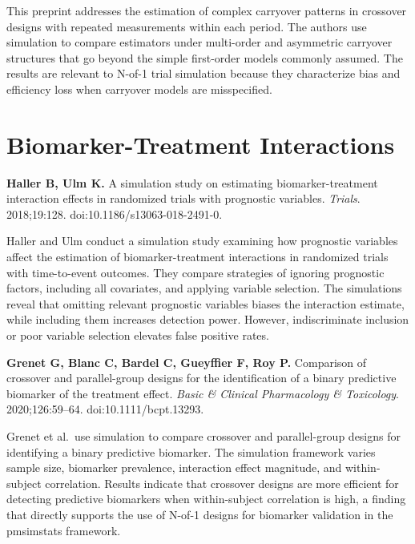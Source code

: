 \documentclass[11pt]{article}
\begin{document}
\smallskip\noindent
This preprint addresses the estimation of complex carryover
patterns in crossover designs with repeated measurements
within each period. The authors use simulation to compare
estimators under multi-order and asymmetric carryover
structures that go beyond the simple first-order models
commonly assumed. The results are relevant to N-of-1 trial
simulation because they characterize bias and efficiency
loss when carryover models are misspecified.

\section{Biomarker-Treatment Interactions}

\textbf{Haller B, Ulm K.} A simulation study on estimating
biomarker-treatment interaction effects in randomized
trials with prognostic variables. \textit{Trials}.
2018;19:128. doi:10.1186/s13063-018-2491-0.

\smallskip\noindent
Haller and Ulm conduct a simulation study examining how
prognostic variables affect the estimation of
biomarker-treatment interactions in randomized trials with
time-to-event outcomes. They compare strategies of ignoring
prognostic factors, including all covariates, and applying
variable selection. The simulations reveal that omitting
relevant prognostic variables biases the interaction
estimate, while including them increases detection power.
However, indiscriminate inclusion or poor variable selection
elevates false positive rates.

\medskip
\textbf{Grenet G, Blanc C, Bardel C, Gueyffier F, Roy P.}
Comparison of crossover and parallel-group designs for the
identification of a binary predictive biomarker of the
treatment effect. \textit{Basic \& Clinical Pharmacology \&
Toxicology}. 2020;126:59--64. doi:10.1111/bcpt.13293.

\smallskip\noindent
Grenet et al.\ use simulation to compare crossover and
parallel-group designs for identifying a binary predictive
biomarker. The simulation framework varies sample size,
biomarker prevalence, interaction effect magnitude, and
within-subject correlation. Results indicate that crossover
designs are more efficient for detecting predictive
biomarkers when within-subject correlation is high, a
finding that directly supports the use of N-of-1 designs
for biomarker validation in the pmsimstats framework.
\end{document}
